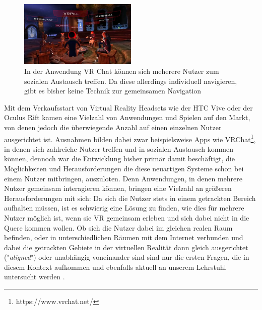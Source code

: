 \begin{figure}[h]
  \centering
  \includegraphics[width=0.5\textwidth]{images/vr_chat.png}
  \caption{In der Anwendung VR Chat können sich meherere Nutzer zum sozialen Austausch treffen. Da diese allerdings individuell navigieren, gibt es bisher keine Technik zur gemeinsamen Navigation}
  \label{fig:todo}
\end{figure}


Mit dem Verkaufsstart von Virtual Reality Headsets wie der HTC Vive oder der Oculus Rift kamen eine Vielzahl von Anwendungen und Spielen auf den Markt, von denen jedoch die überwiegende Anzahl auf einen einzelnen Nutzer ausgerichtet ist. Ausnahmen bilden dabei zwar beispielsweise Apps wie VRChat\footnote{https://www.vrchat.net/}, in denen sich zahlreiche Nutzer treffen und in sozialen Austausch kommen können, dennoch war die Entwicklung bisher primär damit beschäftigt, die Möglichkeiten und Herausforderungen die diese neuartigen Systeme schon bei einem Nutzer mitbringen, auszuloten. 
Denn Anwendungen, in denen mehrere Nutzer gemeinsam interagieren können, bringen eine Vielzahl an größeren Herausforderungen mit sich: Da sich die Nutzer stets in einem getrackten Bereich aufhalten müssen, ist es schwierig eine Lösung zu finden, wie dies für mehrere Nutzer möglich ist, wenn sie VR gemeinsam erleben und sich dabei nicht in die Quere kommen wollen. Ob sich die Nutzer dabei im gleichen realen Raum befinden, oder in unterschiedlichen Räumen mit dem Internet verbunden und dabei die getrackten Gebiete in der virtuellen Realität dann gleich ausgerichtet ("\textit{aligned}") oder unabhängig voneinander sind sind nur die ersten Fragen, die in diesem Kontext aufkommen und ebenfalls aktuell an unserem Lehrstuhl untersucht werden \cite{WeisskerMulti-RayReality}.

